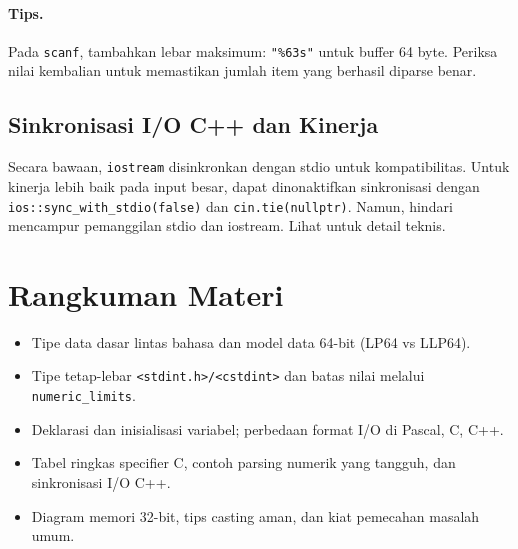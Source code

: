 \documentclass[../main.tex]{subfiles}
\begin{document}
\paragraph{Tips.} Pada \texttt{scanf}, tambahkan lebar maksimum: \texttt{"\%63s"} untuk buffer 64 byte. Periksa nilai kembalian untuk memastikan jumlah item yang berhasil diparse benar.

\subsection{Sinkronisasi I/O C++ dan Kinerja}
Secara bawaan, \texttt{iostream} disinkronkan dengan stdio untuk kompatibilitas. Untuk kinerja lebih baik pada input besar, dapat dinonaktifkan sinkronisasi dengan \texttt{ios::sync\_\allowbreak{}with\_\allowbreak{}stdio(false)} dan \texttt{cin.tie(nullptr)}. Namun, hindari mencampur pemanggilan stdio dan iostream. Lihat \parencite{cpp-sync-with-stdio} untuk detail teknis.

\section{Rangkuman Materi}
\begin{itemize}
  \item Tipe data dasar lintas bahasa dan model data 64-bit (LP64 vs LLP64).
  \item Tipe tetap-lebar \texttt{<stdint.h>/<cstdint>} dan batas nilai melalui \texttt{numeric\_limits}.
  \item Deklarasi dan inisialisasi variabel; perbedaan format I/O di Pascal, C, C++.
  \item Tabel ringkas specifier C, contoh parsing numerik yang tangguh, dan sinkronisasi I/O C++.
  \item Diagram memori 32-bit, tips casting aman, dan kiat pemecahan masalah umum.
\end{itemize}
\end{document}
